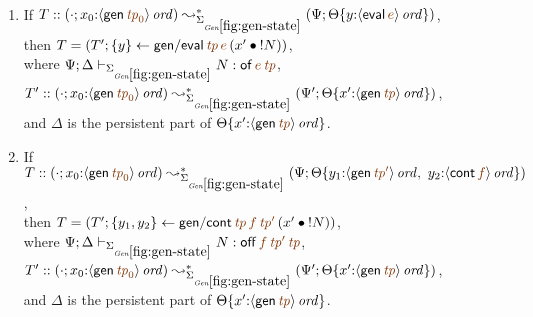 \begin{lemma}~
\begin{enumerate}
\item If 
   $T :: (\cdot; x_0{:}\istrue{\susp{{\sf gen}\,\lf{{\it tp}_0}}})
         \leadsto^*_{\siggenstate}
         (\Psi; \tackon{\Theta}
            {y{:}\istrue{\susp{{\sf eval}\,\lf{e}}}})$,
\\ then 
   $T = \left(T'; \trstep{y}{{\sf gen/eval}\,\lf{{\it tp}}\,\lf{e}\,
                                  (\tfuser{x'}{\tbangr{N}})}\right)$,
\\ where
   $\Psi; \Delta \vdash_{\siggenstate} N : {{\sf of}\,\lf{e}\,\lf{{\it tp}}}$,
\\ $T' :: (\cdot; x_0{:}\istrue{\susp{{\sf gen}\,\lf{{\it tp}_0}}})
       \leadsto^*_{\siggenstate}
       (\Psi'; \tackon{\Theta}
          {x'{:}\istrue{\susp{{\sf gen}\,\lf{{\it tp}}}}})$, 
\\ and $\Delta$ is the persistent part of 
   $\tackon{\Theta}
          {x'{:}\istrue{\susp{{\sf gen}\,\lf{{\it tp}}}}}$.
   
\medskip
\item If 
   $T :: (\cdot; x_0{:}\istrue{\susp{{\sf gen}\,\lf{{\it tp}_0}}})
         \leadsto^*_{\siggenstate}
         (\Psi; \tackon{\Theta}
            {y_1{:}\istrue{\susp{{\sf gen}\,\lf{{\it tp}'}}}, ~
             y_2{:}\istrue{\susp{{\sf cont}\,\lf{f}}}})$,
\\ then 
   $T = \left(T'; \trstep{y_1,y_2}
              {{\sf gen/cont}\,\lf{{\it tp}}\,\lf{f}\,\lf{{\it tp}'}\,
                (\tfuser{x'}{\tbangr{N}})}\right)$,
\\ where 
   $\Psi; \Delta \vdash_{\siggenstate} N : 
       {{{\sf off}\,\lf{f}\,\lf{{\it tp}'}\,\lf{{\it tp}}}}$,
\\ $T' :: (\cdot; x_0{:}\istrue{\susp{{\sf gen}\,\lf{{\it tp}_0}}})
       \leadsto^*_{\siggenstate}
       (\Psi'; \tackon{\Theta}
          {x'{:}\istrue{\susp{{\sf gen}\,\lf{{\it tp}}}}})$,
\\ and $\Delta$ is the persistent part of 
   $\tackon{\Theta}
          {x'{:}\istrue{\susp{{\sf gen}\,\lf{{\it tp}}}}}$.



\end{enumerate}
\end{lemma}
